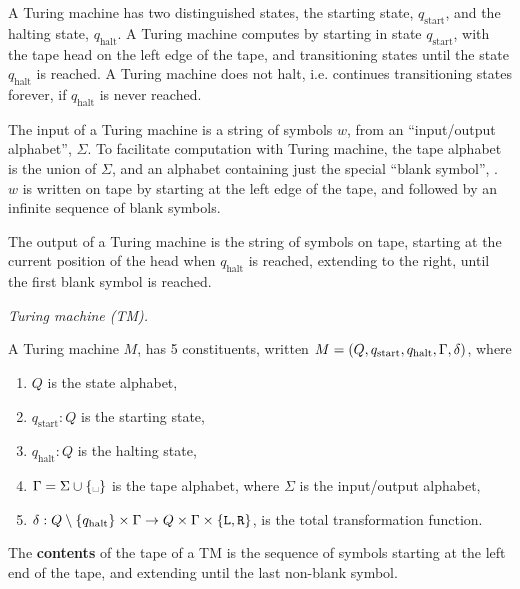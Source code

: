 \def\qstart{\ensuremath{q_{\text{start}}}}
\def\qhalt{\ensuremath{q_{\text{halt}}}}

A Turing machine has two distinguished states, the starting state, \qstart{},
and the halting state, \qhalt{}. A Turing machine computes by starting in state
\qstart{}, with the tape head on the left edge of the tape, and transitioning
states until the state \qhalt{} is reached. A Turing machine does not halt,
i.e.  continues transitioning states forever, if \qhalt{} is never reached.

The input of a Turing machine is a string of symbols $w$, from an
``input/output alphabet'', $\Sigma$. To facilitate computation with Turing
machine, the tape alphabet is the union of $\Sigma$, and an alphabet containing
just the special ``blank symbol'', \textvisiblespace. $w$ is written on tape by
starting at the left edge of the tape, and followed by an infinite sequence of
blank symbols.

The output of a Turing machine is the string of symbols on tape, starting at
the current position of the head when $\qhalt$ is reached, extending to the
right, until the first blank symbol is reached.

\begin{notion} \emph{Turing machine (TM).}

A Turing machine $M$, has 5 constituents, written
$M=\p{Q,\qstart,\qhalt,\Gamma, \delta}$, where

\begin{enumerate}

\item $Q$ is the state alphabet,

\item $\qstart :  Q$ is the starting state,

\item $\qhalt : Q$ is the halting state,

\item $\Gamma=\Sigma\cup\set{\text{\textvisiblespace}}$ is the tape alphabet,
where $\Sigma$ is the input/output alphabet,

\item $\delta:Q\setminus\set{\qhalt}\times\Gamma \rightarrow
Q\times\Gamma\times\set{\mathtt{L},\mathtt{R}}$, is the total transformation
function.

\end{enumerate}

\end{notion}

\begin{definition}

The \textbf{contents} of the tape of a TM is the sequence of symbols starting
at the left end of the tape, and extending until the last non-blank symbol.

\end{definition}

